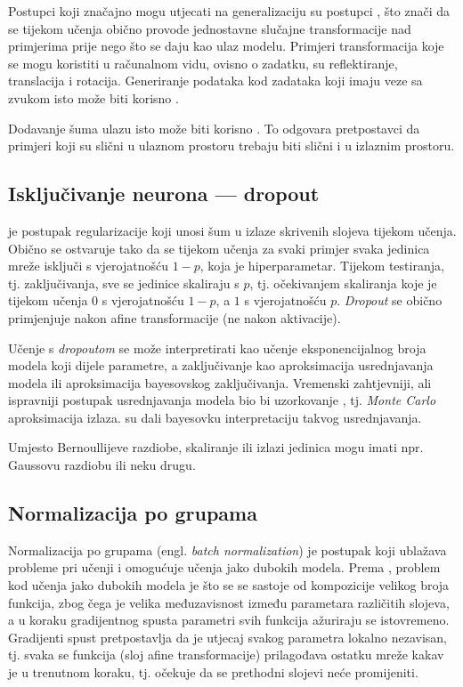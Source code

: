 \documentclass[utf8, diplomski, lmodern]{fer}
\begin{document}
Postupci koji značajno mogu utjecati na generalizaciju su postupci , što znači da se tijekom učenja obično provode jednostavne slučajne transformacije nad primjerima prije nego što se daju kao ulaz modelu. Primjeri transformacija koje se mogu koristiti u računalnom vidu, ovisno o zadatku, su reflektiranje, translacija i rotacija. Generiranje podataka kod zadataka koji imaju veze sa zvukom isto može biti korisno \cite{Goodfellow:2016:DL}.

Dodavanje šuma ulazu isto može biti korisno \citep{Goodfellow:2016:DL}. To odgovara pretpostavci da primjeri koji su slični u ulaznom prostoru trebaju biti slični i u izlaznim prostoru.

\subsection{Isključivanje neurona --- dropout} \label{subsec:dropout}

 \citep{Hinton:2012:INNPCAFD,Srivastava:2014:DASWPNNO} je postupak regularizacije koji unosi šum u izlaze skrivenih slojeva tijekom učenja. Obično se ostvaruje tako da se tijekom učenja za svaki primjer svaka jedinica mreže isključi s vjerojatnošću $1-p$, koja je hiperparametar. Tijekom testiranja, tj. zaključivanja, sve se jedinice skaliraju s $p$, tj. očekivanjem skaliranja koje je tijekom učenja $0$ s vjerojatnošću $1-p$, a $1$ s vjerojatnošću $p$. \textit{Dropout} se obično primjenjuje nakon afine transformacije (ne nakon aktivacije).

Učenje s \textit{dropoutom} se može interpretirati kao učenje eksponencijalnog broja modela koji dijele parametre, a zaključivanje kao aproksimacija usrednjavanja modela ili aproksimacija bayesovskog zaključivanja. Vremenski zahtjevniji, ali ispravniji postupak usrednjavanja modela bio bi uzorkovanje \citep{Srivastava:2014:DASWPNNO}, tj. \textit{Monte Carlo} aproksimacija izlaza. \citet{Gal:2015:DBA} su dali bayesovku interpretaciju takvog usrednjavanja. 

Umjesto Bernoullijeve razdiobe, skaliranje ili izlazi jedinica mogu imati npr. Gaussovu razdiobu ili neku drugu.

\subsection{Normalizacija po grupama}

Normalizacija po grupama (engl. \textit{batch normalization}) \citep{Ioffe:2015:BNADNTRUCS} je postupak koji ublažava probleme pri učenji i omogućuje učenja jako dubokih modela. Prema \citet{Goodfellow:2016:DL}, problem kod učenja jako dubokih modela je što se se sastoje od kompozicije velikog broja funkcija, zbog čega je velika međuzavisnost između parametara različitih slojeva, a u koraku gradijentnog spusta parametri svih funkcija ažuriraju se istovremeno. Gradijenti spust pretpostavlja da je utjecaj svakog parametra lokalno nezavisan, tj. svaka se funkcija (sloj afine transformacije) prilagođava ostatku mreže kakav je u trenutnom koraku, tj. očekuje da se prethodni slojevi neće promijeniti.
\end{document}
